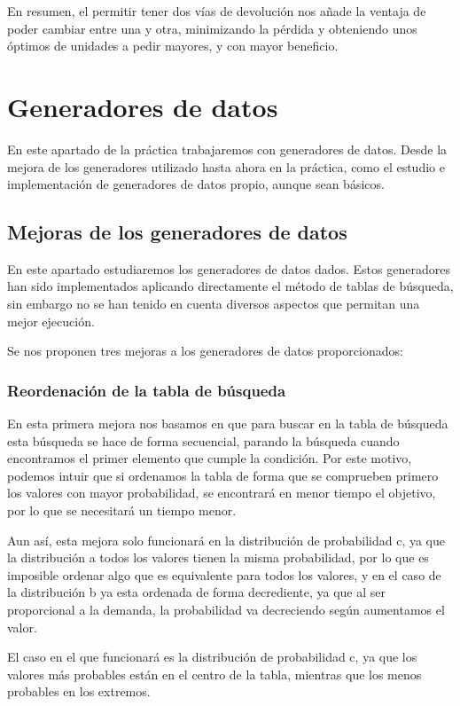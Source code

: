 \documentclass[12pt, spanish]{article}
\begin{document}
En resumen, el permitir tener dos vías de devolución nos añade la ventaja de poder cambiar entre una y otra, minimizando la pérdida y obteniendo unos óptimos de unidades a pedir mayores, y con mayor beneficio.


\section{Generadores de datos}

En este apartado de la práctica trabajaremos con generadores de datos. Desde la mejora de los generadores utilizado hasta ahora en la práctica, como el estudio e implementación de generadores de datos propio, aunque sean básicos.

\subsection{Mejoras de los generadores de datos}

En este apartado estudiaremos los generadores de datos dados. Estos generadores han sido implementados aplicando directamente el método de tablas de búsqueda, sin embargo no se han tenido en cuenta diversos aspectos que permitan una mejor ejecución.

Se nos proponen tres mejoras a los generadores de datos proporcionados:

\subsubsection{Reordenación de la tabla de búsqueda}

En esta primera mejora nos basamos en que para buscar en la tabla de búsqueda esta búsqueda se hace de forma secuencial, parando la búsqueda cuando encontramos el primer elemento que cumple la condición. Por este motivo, podemos intuir que si ordenamos la tabla de forma que se comprueben primero los valores con mayor probabilidad, se encontrará en menor tiempo el objetivo, por lo que se necesitará un tiempo menor.

Aun así, esta mejora solo funcionará en la distribución de probabilidad c, ya que la distribución a todos los valores tienen la misma probabilidad, por lo que es imposible ordenar algo que es equivalente para todos los valores, y en el caso de la distribución b ya esta ordenada de forma decrediente, ya que al ser proporcional a la demanda, la probabilidad va decreciendo según aumentamos el valor.


El caso en el que funcionará es la distribución de probabilidad c, ya que los valores más probables están en el centro de la tabla, mientras que los menos probables en los extremos.
\end{document}
